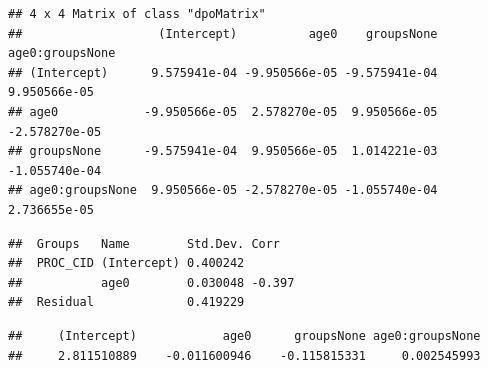\begin{frame}[fragile]

\small

\begin{Shaded}
\begin{Highlighting}[]
\end{Highlighting}
\end{Shaded}

\begin{verbatim}
## 4 x 4 Matrix of class "dpoMatrix"
##                   (Intercept)          age0    groupsNone age0:groupsNone
## (Intercept)      9.575941e-04 -9.950566e-05 -9.575941e-04    9.950566e-05
## age0            -9.950566e-05  2.578270e-05  9.950566e-05   -2.578270e-05
## groupsNone      -9.575941e-04  9.950566e-05  1.014221e-03   -1.055740e-04
## age0:groupsNone  9.950566e-05 -2.578270e-05 -1.055740e-04    2.736655e-05
\end{verbatim}

\end{frame}

\begin{frame}[fragile]

\small

\begin{Shaded}
\begin{Highlighting}[]
\end{Highlighting}
\end{Shaded}

\begin{verbatim}
##  Groups   Name        Std.Dev. Corr  
##  PROC_CID (Intercept) 0.400242       
##           age0        0.030048 -0.397
##  Residual             0.419229
\end{verbatim}

\end{frame}

\begin{frame}[fragile]

\small

\begin{Shaded}
\begin{Highlighting}[]
\end{Highlighting}
\end{Shaded}

\begin{verbatim}
##     (Intercept)            age0      groupsNone age0:groupsNone 
##     2.811510889    -0.011600946    -0.115815331     0.002545993
\end{verbatim}

\end{frame}

